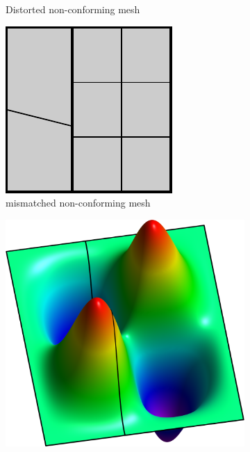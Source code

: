 \documentclass[preprint,12pt]{elsarticle}
\theoremstyle{remark}
\begin{document}
\begin{figure}[hbt]
\begin{subfigure}[b]{0.47\textwidth}
        \caption{Distorted non-conforming mesh}\label{fig:two_patch_biharmonic_problem_distorted}
    \end{subfigure}
    \begin{subfigure}[b]{0.47\textwidth}
        \includegraphics[width=\textwidth]{two_patch_nonmatch}
        \caption{mismatched non-conforming mesh}\label{fig:two_patch_biharmonic_problem_nonmatch}
    \end{subfigure}
    \begin{subfigure}[b]{0.47\textwidth}
        \includegraphics[width=\textwidth]{two_patches_solution-plot}

\end{subfigure}
\end{figure}
\end{document}
